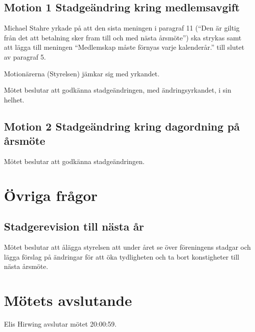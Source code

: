\documentclass[a4paper,11pt,oneside]{article}
\begin{document}
\subsection{Motion 1 Stadgeändring kring medlemsavgift}
Michael Stahre yrkade på att den sista meningen i paragraf 11 (``Den är giltig från det
att betalning sker fram till och med nästa årsmöte'') ska strykas samt att lägga till
meningen ``Medlemskap måste förnyas varje kalenderår.'' till slutet av paragraf 5.

Motionärerna (Styrelsen) jämkar sig med yrkandet.

Mötet beslutar att godkänna stadgeändringen, med ändringsyrkandet, i sin helhet.

\subsection{Motion 2 Stadgeändring kring dagordning på årsmöte}
Mötet beslutar att godkänna stadgeändringen.

\section{Övriga frågor}
\subsection{Stadgerevision till nästa år}
Mötet beslutar att ålägga styrelsen att under året se över föreningens stadgar och lägga
förslag på ändringar för att öka tydligheten och ta bort konstigheter till nästa årsmöte.

\section{Mötets avslutande}
Elis Hirwing avslutar mötet 20:00:59.
\end{document}
